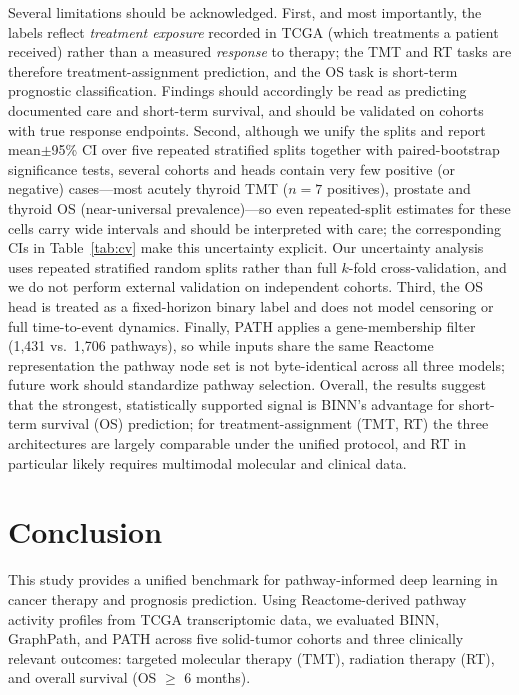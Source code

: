 \documentclass[sigconf]{acmart}
\begin{document}
Several limitations should be acknowledged. First, and most importantly, the
labels reflect \emph{treatment exposure} recorded in TCGA (which treatments a
patient received) rather than a measured \emph{response} to therapy; the TMT
and RT tasks are therefore treatment-assignment prediction, and the OS task is
short-term prognostic classification. Findings should accordingly be read as
predicting documented care and short-term survival, and should be validated on
cohorts with true response endpoints. Second, although we unify the splits and
report mean$\pm$95\% CI over five repeated stratified splits together with
paired-bootstrap significance tests, several cohorts and heads contain very few
positive (or negative) cases---most acutely thyroid TMT ($n{=}7$ positives),
prostate and thyroid OS (near-universal prevalence)---so even repeated-split
estimates for these cells carry wide intervals and should be interpreted with
care; the corresponding CIs in Table~\ref{tab:cv} make this uncertainty
explicit. Our uncertainty analysis uses repeated stratified random splits
rather than full $k$-fold cross-validation, and we do not perform external
validation on independent cohorts. Third, the OS head is treated as a
fixed-horizon binary label and does not model censoring or full time-to-event
dynamics. Finally, PATH applies a gene-membership filter (1{,}431 vs.\ 1{,}706
pathways), so while inputs share the same Reactome representation the pathway
node set is not byte-identical across all three models; future work should
standardize pathway selection. Overall, the results suggest that the strongest, statistically supported
signal is BINN's advantage for short-term survival (OS) prediction; for
treatment-assignment (TMT, RT) the three architectures are largely
comparable under the unified protocol, and RT in particular likely requires
multimodal molecular and clinical data.


\section{Conclusion}

This study provides a unified benchmark for pathway-informed deep learning in cancer therapy and prognosis prediction. Using Reactome-derived pathway activity profiles from TCGA transcriptomic data, we evaluated BINN, GraphPath, and PATH across five solid-tumor cohorts and three clinically relevant outcomes: targeted molecular therapy (TMT), radiation therapy (RT), and overall survival (OS $\geq$ 6 months).
\end{document}
